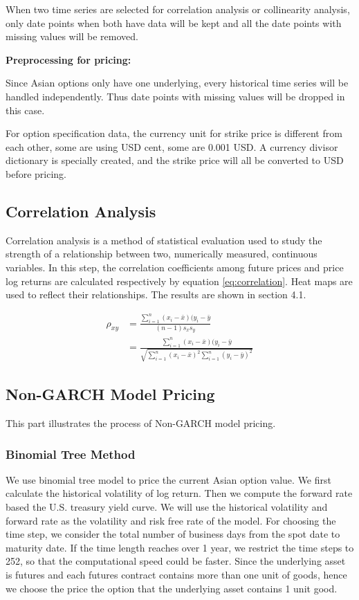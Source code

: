 \documentclass[10pt, a4paper, twocolumn]{article} %
\begin{document}
When two time series are selected for correlation analysis or collinearity analysis, only date points when both have data will be kept and all the date points with missing values will be removed.

\textbf {Preprocessing for pricing:}

Since Asian options only have one underlying, every historical time series will be handled independently. Thus date points with missing values will be dropped in this case.

For option specification data, the currency unit for strike price is different from each other, some are using USD cent, some are 0.001 USD. A currency divisor dictionary is specially created, and the strike price will all be converted to USD before pricing.

\subsection{Correlation Analysis}

Correlation analysis is a method of statistical evaluation used to study the strength of a relationship between two, numerically measured, continuous variables. In this step, the correlation coefficients among future prices and price log returns are calculated respectively by equation \ref{eq:correlation}. Heat maps are used to reflect their relationships. The results are shown in section 4.1.

\begin{equation} \label{eq:correlation}
\begin{aligned}
\rho_{xy} &= \frac {\sum_{i=1}^n (x_i-\bar x)(y_i-\bar y}{(n-1)s_xs_y}
\\
&=\frac {\sum_{i=1}^n (x_i-\bar x)(y_i-\bar y}{\sqrt{\sum_{i=1}^n(x_i - \bar x)^2 \sum_{i=1}^n(y_i - \bar y)^2}}
\end{aligned}
\end{equation}

\subsection{Non-GARCH Model Pricing}

This part illustrates the process of Non-GARCH model pricing.

\subsubsection{Binomial Tree Method}

We use binomial tree model to price the current Asian option value. We first calculate the historical volatility of log return. Then we compute the forward rate based the U.S. treasury yield curve. We will use the historical volatility and forward rate as the volatility and risk free rate of the model. For choosing the time step, we consider the total number of business days from the spot date to maturity date. If the time length reaches over 1 year, we restrict the time steps to 252, so that the computational speed could be faster. Since the underlying asset is futures and each futures contract contains more than one unit of goods, hence we choose the price the option that the underlying asset contains 1 unit good.
\end{document}
